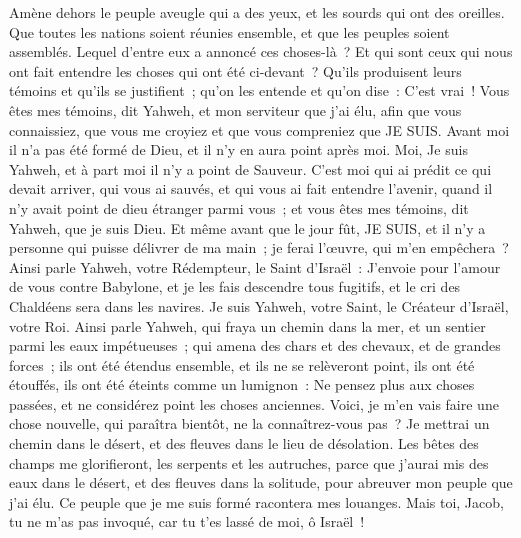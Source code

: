 \begin{multicols}{2}
Amène dehors le peuple aveugle qui a des yeux, et les sourds qui ont des oreilles.
Que toutes les nations soient réunies ensemble, et que les peuples soient assemblés. Lequel d'entre eux a annoncé ces choses-là~? Et qui sont ceux qui nous ont fait entendre les choses qui ont été ci-devant~? Qu'ils produisent leurs témoins et qu'ils se justifient~; qu'on les entende et qu'on dise~: C'est vrai~!
Vous êtes mes témoins, dit Yahweh, et mon serviteur que j'ai élu, afin que vous connaissiez, que vous me croyiez et que vous compreniez que JE SUIS. Avant moi il n'a pas été formé de Dieu, et il n'y en aura point après moi.
Moi, Je suis Yahweh, et à part moi il n'y a point de Sauveur.
C'est moi qui ai prédit ce qui devait arriver, qui vous ai sauvés, et qui vous ai fait entendre l'avenir, quand il n'y avait point de dieu étranger parmi vous~; et vous êtes mes témoins, dit Yahweh, que je suis Dieu.
Et même avant que le jour fût, JE SUIS, et il n'y a personne qui puisse délivrer de ma main~; je ferai l'œuvre, qui m'en empêchera~?
Ainsi parle Yahweh, votre Rédempteur, le Saint d'Israël~: J'envoie pour l'amour de vous contre Babylone, et je les fais descendre tous fugitifs, et le cri des Chaldéens sera dans les navires.
Je suis Yahweh, votre Saint, le Créateur d'Israël, votre Roi.
Ainsi parle Yahweh, qui fraya un chemin dans la mer, et un sentier parmi les eaux impétueuses~;
qui amena des chars et des chevaux, et de grandes forces~; ils ont été étendus ensemble, et ils ne se relèveront point, ils ont été étouffés, ils ont été éteints comme un lumignon~:
Ne pensez plus aux choses passées, et ne considérez point les choses anciennes.
Voici, je m'en vais faire une chose nouvelle, qui paraîtra bientôt, ne la connaîtrez-vous pas~? Je mettrai un chemin dans le désert, et des fleuves dans le lieu de désolation.
Les bêtes des champs me glorifieront, les serpents et les autruches, parce que j'aurai mis des eaux dans le désert, et des fleuves dans la solitude, pour abreuver mon peuple que j'ai élu.
Ce peuple que je me suis formé racontera mes louanges.
Mais toi, Jacob, tu ne m'as pas invoqué, car tu t'es lassé de moi, ô Israël~!

\end{multicols}
